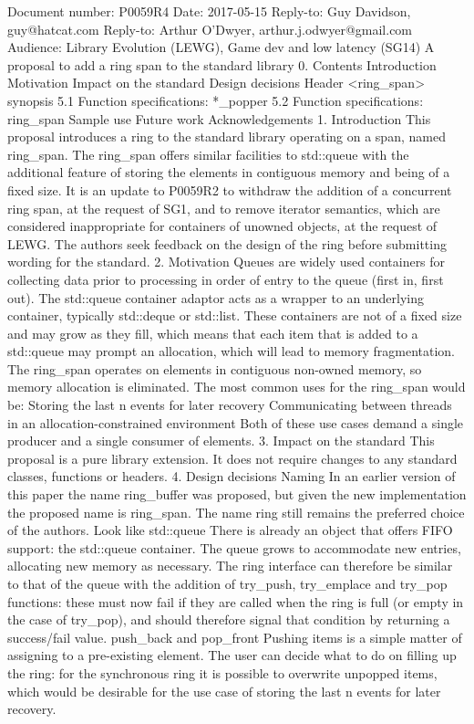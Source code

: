 Document number: P0059R4
Date: 2017-05-15
Reply-to: Guy Davidson, guy@hatcat.com
Reply-to: Arthur O’Dwyer, arthur.j.odwyer@gmail.com
Audience: Library Evolution (LEWG), Game dev and low latency (SG14)
A proposal to add a ring span to the standard library
0. Contents
Introduction
Motivation
Impact on the standard
Design decisions
Header <ring_span> synopsis
5.1 Function specifications: *_popper
5.2 Function specifications: ring_span
Sample use
Future work
Acknowledgements
1. Introduction
This proposal introduces a ring to the standard library operating on a span, named ring_span.  The ring_span offers similar facilities to std::queue with the additional feature of storing the elements in contiguous memory and being of a fixed size.  It is an update to P0059R2 to withdraw the addition of a concurrent ring span, at the request of SG1, and to remove iterator semantics, which are considered inappropriate for containers of unowned objects, at the request of LEWG.  The authors seek feedback on the design of the ring before submitting wording for the standard.
2. Motivation
Queues are widely used containers for collecting data prior to processing in order of entry to the queue (first in, first out).  The std::queue container adaptor acts as a wrapper to an underlying container, typically std::deque or std::list.  These containers are not of a fixed size and may grow as they fill, which means that each item that is added to a std::queue may prompt an allocation, which will lead to memory fragmentation.  The ring_span operates on elements in contiguous non-owned memory, so memory allocation is eliminated.  The most common uses for the ring_span would be:
Storing the last n events for later recovery
Communicating between threads in an allocation-constrained environment
Both of these use cases demand a single producer and a single consumer of elements.
3. Impact on the standard
This proposal is a pure library extension.  It does not require changes to any standard classes, functions or headers.
4. Design decisions
Naming
In an earlier version of this paper the name ring_buffer was proposed, but given the new implementation the proposed name is ring_span.  The name ring still remains the preferred choice of the authors.
Look like std::queue
There is already an object that offers FIFO support: the std::queue container.  The queue grows to accommodate new entries, allocating new memory as necessary.  The ring interface can therefore be similar to that of the queue with the addition of try_push, try_emplace and try_pop functions: these must now fail if they are called when the ring is full (or empty in the case of try_pop), and should therefore signal that condition by returning a success/fail value.
push_back and pop_front
Pushing items is a simple matter of assigning to a pre-existing element. The user can decide what to do on filling up the ring: for the synchronous ring it is possible to overwrite unpopped items, which would be desirable for the use case of storing the last n events for later recovery.
 
